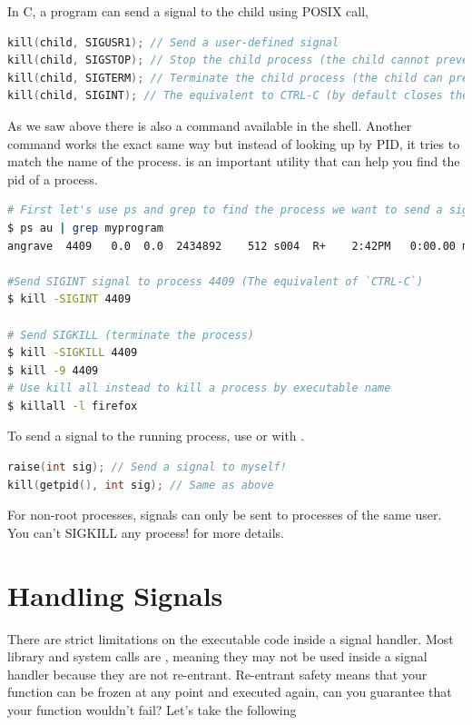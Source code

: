 In C, a program can send a signal to the child using  POSIX call,

\begin{lstlisting}[language=C]
kill(child, SIGUSR1); // Send a user-defined signal
kill(child, SIGSTOP); // Stop the child process (the child cannot prevent this)
kill(child, SIGTERM); // Terminate the child process (the child can prevent this)
kill(child, SIGINT); // The equivalent to CTRL-C (by default closes the process)
\end{lstlisting}

As we saw above there is also a  command available in the shell.
Another command  works the exact same way but instead of looking up by PID, it tries to match the name of the process.
 is an important utility that can help you find the pid of a process.

\begin{lstlisting}[language=bash]
# First let's use ps and grep to find the process we want to send a signal to
$ ps au | grep myprogram
angrave  4409   0.0  0.0  2434892    512 s004  R+    2:42PM   0:00.00 myprogram 1 2 3

#Send SIGINT signal to process 4409 (The equivalent of `CTRL-C`)
$ kill -SIGINT 4409

# Send SIGKILL (terminate the process)
$ kill -SIGKILL 4409
$ kill -9 4409
# Use kill all instead to kill a process by executable name
$ killall -l firefox
\end{lstlisting}

To send a signal to the running process, use  or  with .

\begin{lstlisting}[language=C]
raise(int sig); // Send a signal to myself!
kill(getpid(), int sig); // Same as above
\end{lstlisting}

For non-root processes, signals can only be sent to processes of the same user.
You can't SIGKILL any process!
 for more details.

\section{Handling Signals}

There are strict limitations on the executable code inside a signal handler.
Most library and system calls are , meaning they may not be used inside a signal handler because they are not re-entrant.
Re-entrant safety means that your function can be frozen at any point and executed again, can you guarantee that your function wouldn't fail?
Let's take the following

